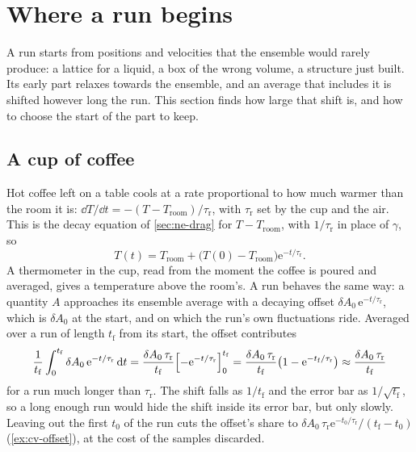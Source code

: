 \section{Where a run begins}
\label{sec:cv-equilibration}

A run starts from positions and velocities that the ensemble would rarely
produce: a lattice for a liquid, a box of the wrong volume, a structure
just built. Its early part relaxes towards the ensemble, and an average
that includes it is shifted however long the run. This section finds how
large that shift is, and how to choose the start of the part to keep.

\subsection*{A cup of coffee}

Hot coffee left on a table cools at a rate proportional to how much
warmer than the room it is: $\dd T/\dd t = -(T - T_{\mathrm{room}})/\tau_{\mathrm r}$,
with $\tau_{\mathrm r}$ set by the cup and the air. This is the decay
equation of \cref{sec:ne-drag} for $T - T_{\mathrm{room}}$, with
$1/\tau_{\mathrm r}$ in place of $\gamma$, so
\begin{equation*}
   T(t) = T_{\mathrm{room}} + \bigl(T(0) - T_{\mathrm{room}}\bigr)
   \mathrm{e}^{-t/\tau_{\mathrm r}} .
\end{equation*}
A thermometer in the cup, read from the moment the coffee is poured and
averaged, gives a temperature above the room's. A run behaves the same
way: a quantity $A$ approaches its ensemble average with a decaying offset
$\delta A_0\,\mathrm{e}^{-t/\tau_{\mathrm r}}$, which is $\delta A_0$ at the
start, and on which the run's own
fluctuations ride. Averaged over a run of length $t_{\mathrm f}$ from its
start, the offset contributes
\begin{equation*}
   \frac{1}{t_{\mathrm f}}\int_0^{t_{\mathrm f}}\delta A_0\,
   \mathrm{e}^{-t/\tau_{\mathrm r}}\,\mathrm{d} t
   = \frac{\delta A_0\,\tau_{\mathrm r}}{t_{\mathrm f}}\Bigl[-\mathrm{e}^{-t/
   \tau_{\mathrm r}}\Bigr]_0^{t_{\mathrm f}}
   = \frac{\delta A_0\,\tau_{\mathrm r}}{t_{\mathrm f}}\bigl(1 -
   \mathrm{e}^{-t_{\mathrm f}/\tau_{\mathrm r}}\bigr)
   \approx \frac{\delta A_0\,\tau_{\mathrm r}}{t_{\mathrm f}}
\end{equation*}
for a run much longer than $\tau_{\mathrm r}$. The shift falls as
$1/t_{\mathrm f}$ and the error bar as $1/\sqrt{t_{\mathrm f}}$, so a long
enough run would hide the shift inside its error bar, but only slowly.
Leaving out the first $t_0$ of the run cuts the offset's share to
$\delta A_0\,\tau_{\mathrm r}\mathrm{e}^{-t_0/\tau_{\mathrm r}}/(t_{\mathrm f}
- t_0)$ (\cref{ex:cv-offset}), at the cost of the samples discarded.

